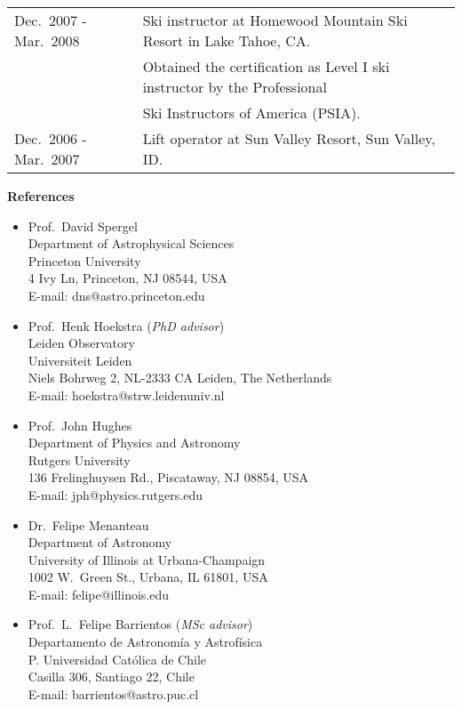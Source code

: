 \documentclass[11pt]{article}
\begin{document}
\begin{table}[h!]
\begin{tabular}{l l}
Dec.~2007 - Mar.~2008 & Ski instructor at Homewood Mountain Ski Resort in Lake Tahoe, CA.\\
                      & Obtained the certification as Level I ski instructor  by the Professional\\
                      & Ski Instructors of America (PSIA).\\
Dec.~2006 - Mar.~2007 & Lift operator at Sun Valley Resort, Sun Valley, ID.
\end{tabular}
\end{table}


\pagebreak

\noindent
{\bf\Large References}
\begin{itemize}
 \item Prof.~David Spergel\\
       Department of Astrophysical Sciences\\
       Princeton University\\
       4 Ivy Ln, Princeton, NJ 08544, USA\\
       E-mail: dns@astro.princeton.edu
 \item Prof.~Henk Hoekstra (\textit{PhD advisor})\\
       Leiden Observatory\\
       Universiteit Leiden\\
       Niels Bohrweg 2, NL-2333 CA Leiden, The Netherlands\\
       E-mail: hoekstra@strw.leidenuniv.nl
 \item Prof.~John Hughes\\
       Department of Physics and Astronomy\\
       Rutgers University\\
       136 Frelinghuysen Rd., Piscataway, NJ 08854, USA\\
       E-mail: jph@physics.rutgers.edu
 \item Dr.~Felipe Menanteau\\
       Department of Astronomy\\
       University of Illinois at Urbana-Champaign\\
       1002 W.\ Green St., Urbana, IL 61801, USA\\
       E-mail: felipe@illinois.edu
 \item Prof.~L.~Felipe Barrientos (\textit{MSc advisor})\\
       Departamento de Astronom\'ia y Astrof\'isica\\
       P. Universidad Cat\'olica de Chile\\
       Casilla 306, Santiago 22, Chile\\
       E-mail: barrientos@astro.puc.cl
\end{itemize}



\pagebreak

\end{document}
